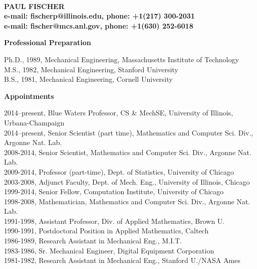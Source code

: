 \documentclass[11pt,letterpaper,english]{article}
\begin{document}
\setlength{\parindent}{0in} %

\pagestyle{fancy}   \renewcommand{%
\headrulewidth}{0.0pt}

\\
{\bf PAUL FISCHER}\\
{\bf e-mail: fischerp@illinois.edu, phone: +1(217) 300-2031}\\
{\bf e-mail: fischer@mcs.anl.gov, phone: +1(630) 252-6018}\\
 \smallskip

\begin{flushleft} {\bf Professional Preparation}
{\parindent 16pt

Ph.D., 1989, Mechanical Engineering, Massachusetts Institute of Technology \\
M.S., 1982, Mechanical Engineering, Stanford University \\
B.S., 1981, Mechanical Engineering, Cornell University \\
}

\vspace{.04in}
{\bf Appointments}
{\parindent 16pt

2014--present, Blue Waters Professor, CS \& MechSE, University of Illinois, Urbana-Champaign \\
2014--present, Senior Scientist (part time), Mathematics and Computer Sci. Div., Argonne Nat. Lab.\\
2008-2014, Senior Scientist, Mathematics and Computer Sci. Div., Argonne Nat. Lab. \\
2009-2014, Professor (part-time), Dept. of Statistics, University of Chicago \\
2003-2008, Adjunct Faculty, Dept. of Mech. Eng., University of Illinois, Chicago \\
1999-2014, Senior Fellow, Computation Institute, University of Chicago \\
1998-2008, Mathematician, Mathematics and Computer Sci. Div., Argonne Nat. Lab. \\
1991-1998, Assistant Professor, Div. of Applied Mathematics, Brown U. \\
1990-1991, Postdoctoral Position in Applied Mathematics, Caltech \\
1986-1989, Research Assistant in Mechanical Eng., M.I.T. \\
1983-1986, Sr. Mechanical Engineer, Digital Equipment Corporation \\
1981-1982, Research Assistant in Mechanical Eng., Stanford U./NASA Ames \\
}


\end{flushleft}
\end{document}
